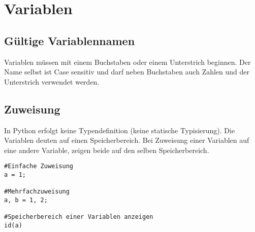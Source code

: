 \chapter{Variablen}
\section{Gültige Variablennamen}
Variablen müssen mit einem Buchstaben oder einem Unterstrich beginnen. Der Name selbst ist Case sensitiv und darf neben Buchstaben auch Zahlen und der Unterstrich verwendet werden.
\section{Zuweisung}
In Python erfolgt keine Typendefinition (keine statische Typisierung). Die Variablen deuten auf einen Speicherbereich. Bei Zuweisung einer Variablen auf eine andere Variable, zeigen beide auf den selben Speicherbereich.
\begin{lstlisting}
#Einfache Zuweisung
a = 1;

#Mehrfachzuweisung
a, b = 1, 2;

#Speicherbereich einer Variablen anzeigen
id(a)
\end{lstlisting}


